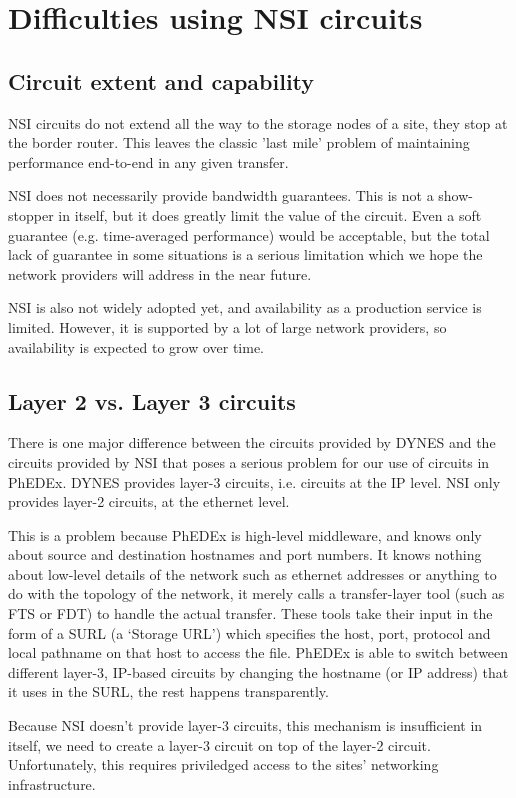 \section{Difficulties using NSI circuits}

\subsection{Circuit extent and capability}
NSI circuits do not extend all the way to the storage nodes of a site, they stop at the border router. This leaves the classic 'last mile' problem of maintaining performance end-to-end in any given transfer.

NSI does not necessarily provide bandwidth guarantees. This is not a show-stopper in itself, but it does greatly limit the value of the circuit. Even a soft guarantee (e.g. time-averaged performance) would be acceptable\cite{BW_sharing}, but the total lack of guarantee in some situations is a serious limitation which we hope the network providers will address in the near future.

NSI is also not widely adopted yet, and availability as a production service is limited. However, it is supported by a lot of large network providers, so availability is expected to grow over time.

\subsection{Layer 2 vs. Layer 3 circuits}

There is one major difference between the circuits provided by DYNES and the circuits provided by NSI that poses a serious problem for our use of circuits in PhEDEx. DYNES provides layer-3 circuits, i.e. circuits at the IP level. NSI only provides layer-2 circuits, at the ethernet level.

This is a problem because PhEDEx is high-level middleware, and knows only about source and destination hostnames and port numbers. It knows nothing about low-level details of the network such as ethernet addresses or anything to do with the topology of the network, it merely calls a transfer-layer tool (such as FTS\cite{FTS} or FDT\cite{FDT}) to handle the actual transfer. These tools take their input in the form of a SURL (a `Storage URL') which specifies the host, port, protocol and local pathname on that host to access the file. PhEDEx is able to switch between different layer-3, IP-based circuits by changing the hostname (or IP address) that it uses in the SURL, the rest happens transparently.

Because NSI doesn't provide layer-3 circuits, this mechanism is insufficient in itself, we need to create a layer-3 circuit on top of the layer-2 circuit. Unfortunately, this requires priviledged access to the sites' networking infrastructure.

